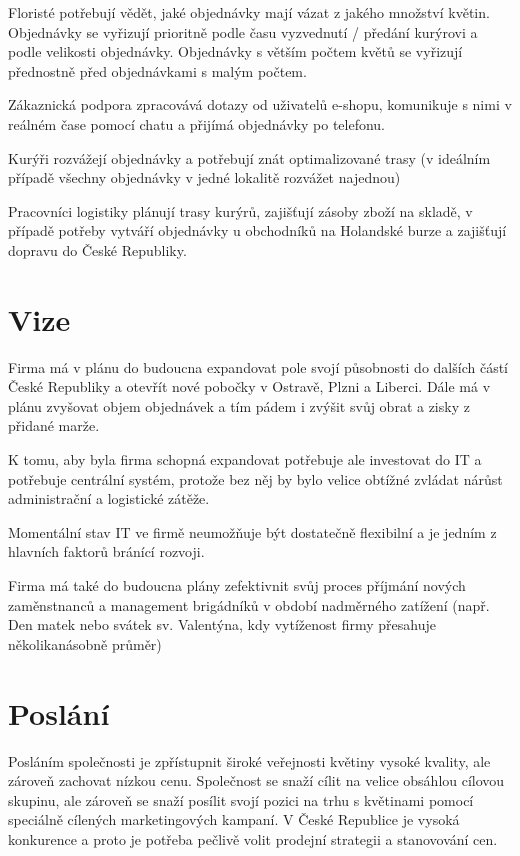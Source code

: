\documentclass{article}
\begin{document}
Floristé potřebují vědět, jaké objednávky mají vázat z jakého množství květin.
Objednávky se vyřizují prioritně podle času vyzvednutí / předání kurýrovi a podle velikosti objednávky.
Objednávky s větším počtem květů se vyřizují přednostně před objednávkami s malým počtem.

Zákaznická podpora zpracovává dotazy od uživatelů e-shopu, komunikuje s nimi v reálném čase pomocí chatu a přijímá objednávky po telefonu.

Kurýři rozvážejí objednávky a potřebují znát optimalizované trasy (v ideálním případě všechny objednávky v jedné lokalitě rozvážet najednou)

Pracovníci logistiky plánují trasy kurýrů, zajišťují zásoby zboží na skladě, v případě potřeby vytváří objednávky u obchodníků na Holandské burze a zajišťují dopravu do České Republiky.

\section*{Vize}

Firma má v plánu do budoucna expandovat pole svojí působnosti do dalších částí České Republiky
a otevřít nové pobočky v Ostravě, Plzni a Liberci. Dále má v plánu zvyšovat objem objednávek a tím
pádem i zvýšit svůj obrat a zisky z přidané marže.

K tomu, aby byla firma schopná expandovat potřebuje ale investovat do IT a potřebuje centrální systém, protože bez něj by bylo velice obtížné zvládat nárůst administrační a logistické zátěže.

Momentální stav IT ve firmě neumožňuje být dostatečně flexibilní a je jedním z hlavních faktorů bránící rozvoji.

Firma má také do budoucna plány zefektivnit svůj proces příjmání nových zaměnstnanců a management brigádníků v období nadměrného zatížení (např. Den matek nebo svátek sv. Valentýna, kdy vytíženost firmy přesahuje několikanásobně průměr)

\section*{Poslání}

Posláním společnosti je zpřístupnit široké veřejnosti květiny vysoké kvality, ale zároveň zachovat nízkou cenu.
Společnost se snaží cílit na velice obsáhlou cílovou skupinu, ale zároveň se snaží posílit svojí pozici na trhu s květinami pomocí speciálně cílených marketingových kampaní. V České Republice je vysoká konkurence a proto je potřeba pečlivě volit prodejní strategii a stanovování cen.
\end{document}
